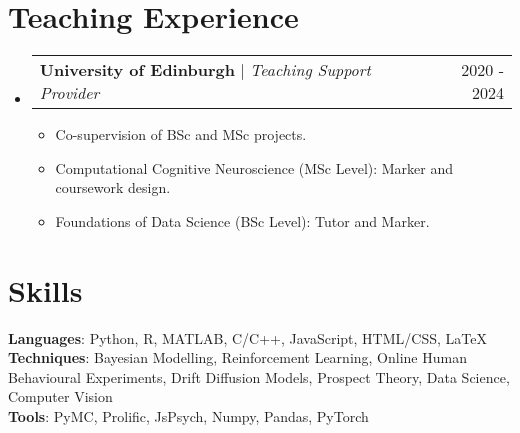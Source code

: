 \documentclass[a4paper,11pt]{article}
\makeatletter
\newcommand{\resumeItem}[1]{
    \item\small{
    {\vspace{-2pt} #1}
  }
}
\newcommand{\resumeProjectHeading}[2]{
    \item
    \begin{tabular*}{0.97\textwidth}{l@{\extracolsep{\fill}}r}
      \small#1 & #2 \\
    \end{tabular*}\vspace{0pt}
}
\newcommand{\resumeSubHeadingListStart}{\begin{itemize}[leftmargin=0.15in, label={}]}
\newcommand{\resumeSubHeadingListEnd}{\end{itemize}}
\newcommand{\resumeItemListStart}{\begin{itemize}[label={\tiny\raisebox{0.5ex}{\textbullet}}]}
\newcommand{\resumeItemListEnd}{\end{itemize}\vspace{-5pt}}
\makeatother
\begin{document}

\section{Teaching Experience}
\resumeSubHeadingListStart
  \resumeProjectHeading
  {\textbf{University of Edinburgh} $|$ \footnotesize\emph{Teaching Support Provider}\vspace{-10pt}}{2020 - 2024}
  \resumeItemListStart
    \resumeItem{Co-supervision of BSc and MSc projects.}
    \resumeItem{Computational Cognitive Neuroscience (MSc Level): Marker and coursework design.}
    \resumeItem{Foundations of Data Science (BSc Level): Tutor and Marker.}
  \resumeItemListEnd
\resumeSubHeadingListEnd






\section{Skills}
\begin{itemize}[leftmargin=0.15in, label={}]
    \small{\item{

          \textbf{Languages}{: Python, R, MATLAB, C/C++, JavaScript, HTML/CSS, \LaTeX} \\
          \textbf{Techniques}{: Bayesian Modelling, Reinforcement Learning, Online Human Behavioural Experiments, Drift Diffusion Models, Prospect Theory, Data Science, Computer Vision}\\
          \textbf{Tools}{: PyMC, Prolific, JsPsych, Numpy, Pandas, PyTorch}
          }}
\end{itemize}
\end{document}
